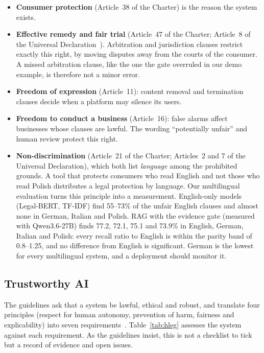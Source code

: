 \begin{itemize}
  \item \textbf{Consumer protection} (Article~38 of the Charter) is the reason the system exists.
  \item \textbf{Effective remedy and fair trial} (Article~47 of the Charter; Article~8 of the Universal Declaration~\citep{udhr1948}). Arbitration and jurisdiction clauses restrict exactly this right, by moving disputes away from the courts of the consumer. A missed arbitration clause, like the one the gate overruled in our demo example, is therefore not a minor error.
  \item \textbf{Freedom of expression} (Article~11): content removal and termination clauses decide when a platform may silence its users.
  \item \textbf{Freedom to conduct a business} (Article~16): false alarms affect businesses whose clauses are lawful. The wording ``potentially unfair'' and human review protect this right.
  \item \textbf{Non-discrimination} (Article~21 of the Charter; Articles~2 and 7 of the Universal Declaration), which both list \emph{language} among the prohibited grounds. A tool that protects consumers who read English and not those who read Polish distributes a legal protection by language. Our multilingual evaluation turns this principle into a measurement. English-only models (Legal-BERT, TF-IDF) find 55--73\% of the unfair English clauses and almost none in German, Italian and Polish. RAG with the evidence gate (measured with Qwen3.6-27B) finds 77.2, 72.1, 75.1 and 73.9\% in English, German, Italian and Polish: every recall ratio to English is within the parity band of 0.8--1.25, and no difference from English is significant. German is the lowest for every multilingual system, and a deployment should monitor it.
\end{itemize}

\subsection{Trustworthy AI}
\label{sec:ethics-hleg}

The guidelines ask that a system be lawful, ethical and robust, and translate four principles (respect for human autonomy, prevention of harm, fairness and explicability) into seven requirements~\citep{hleg2019,slides_trustworthy}. Table~\ref{tab:hleg} assesses the system against each requirement. As the guidelines insist, this is not a checklist to tick but a record of evidence and open issues.

